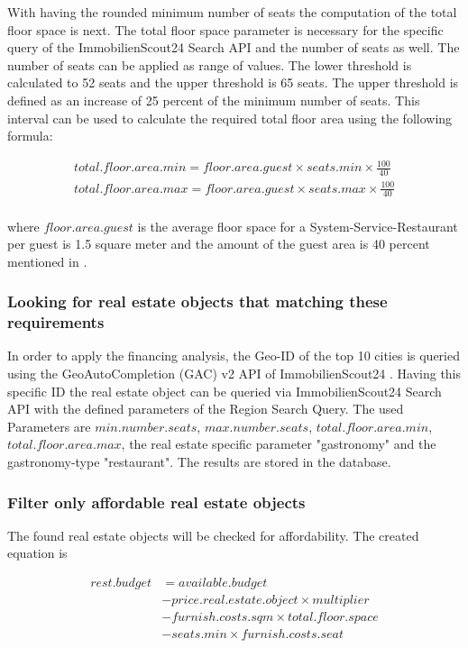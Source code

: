 With having the rounded minimum number of seats the computation of the total floor space is next. The total
 floor space parameter is necessary for the specific query of the ImmobilienScout24 Search API \cite{ImmoScout} and
 the number of seats as well. The number of seats can be applied as range of values. The lower threshold is calculated to 52 seats and
 the upper threshold is 65 seats. The upper threshold is defined as an increase of 25 percent of the minimum number of seats.
 This interval can be used to calculate the required total floor area using the following formula:

\begin{equation}
    \begin{aligned}
        total.floor.area.min = floor.area.guest \times seats.min \times \frac{100}{40} \\
        total.floor.area.max = floor.area.guest \times seats.max \times \frac{100}{40} \\
    \end{aligned}
    \label{eq:total_floor_space}
\end{equation}

where $floor.area.guest$ is the average floor space for a System-Service-Restaurant per guest is 1.5 square meter \cite{FlaecheGast} and the
 amount of the guest area is 40 percent mentioned in \cite{FlaecheGastronomie}.

\subsubsection{Looking for real estate objects that matching these requirements}
In order to apply the financing analysis, the Geo-ID of the top 10 cities is queried using the GeoAutoCompletion (GAC)
 v2 \ac{API} of ImmobilienScout24 \cite{ImmoScout}. Having this specific ID the real estate object can be queried via ImmobilienScout24 Search \ac{API}
 with the defined parameters of the Region Search Query. The used Parameters are $min.number.seats$,
 $max.number.seats$, $total.floor.area.min$, $total.floor.area.max$, the real estate specific parameter
 "gastronomy" and the gastronomy-type "restaurant". The results are stored in the \pg{} database.

\subsubsection{Filter only affordable real estate objects}
The found real estate objects will be checked for affordability. The created equation is
\begin{center}
    \begin{equation}
        \begin{aligned}
            rest.budget & = available.budget \\
                & - price.real.estate.object \times multiplier \\
                & - furnish.costs.sqm \times total.floor.space \\
                & - seats.min \times furnish.costs.seat
        \end{aligned}
        \label{eq:affordable}
    \end{equation}
\end{center}

